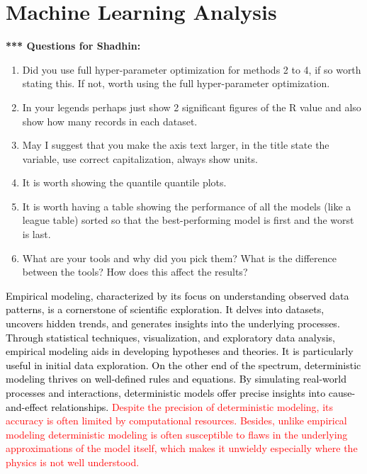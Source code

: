 \documentclass[12pt]{iopart}
\begin{document}
\section{Machine Learning Analysis}
\begin{center} \textbf{*** Questions for Shadhin:} \end{center}
\begin{enumerate}
    \item Did you use full hyper-parameter optimization for methods 2 to 4, if so worth stating this. If not, worth using the full hyper-parameter optimization.
    \item In your legends perhaps just show 2 significant figures of the R value and also show how many records in each dataset.
    \item May I suggest that you make the axis text larger, in the title state the variable, use correct capitalization, always show units. 
    \item It is worth showing the quantile quantile plots.
    \item It is worth having a table showing the performance of all the models (like a league table) sorted so that the best-performing model is first and the worst is last. 
    \item What are your tools and why did you pick them?  What is the difference between the tools?  How does this affect the results?
\end{enumerate}

\textcolor{black}{Empirical modeling, characterized by its focus on understanding observed data patterns, is a cornerstone of scientific exploration. It delves into datasets, uncovers hidden trends, and generates insights into the underlying processes. Through statistical techniques, visualization, and exploratory data analysis, empirical modeling aids in developing hypotheses and theories. It is particularly useful in initial data exploration. On the other end of the spectrum, deterministic modeling thrives on well-defined rules and equations. By simulating real-world processes and interactions, deterministic models offer precise insights into cause-and-effect relationships. \textcolor{red}{Despite the precision of deterministic modeling, its accuracy is often limited by computational resources. Besides, unlike empirical modeling deterministic modeling is often susceptible to flaws in the underlying approximations of the model itself, which makes it unwieldy especially where the physics is not well understood.}}
\end{document}

